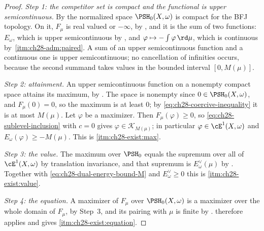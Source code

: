 \begin{proof}
\emph{Step 1: the competitor set is compact and the functional is upper
semicontinuous.}  By  the normalized space
$\PSH_0(X,\omega)$ is compact for the BFJ topology.  On it, $F_\mu$ is
real valued or $-\infty$, by , and it is the sum
of two functions: $E_\omega$, which is upper semicontinuous by
, and
$\varphi\mapsto-\int\varphi\,\rd\mu$, which is continuous by
\,\cref{itm:ch28-adm:paired}.  A sum of an
upper semicontinuous function and a continuous one is upper semicontinuous;
no cancellation of infinities occurs, because the second summand takes
values in the bounded interval $[0,M(\mu)]$.

\emph{Step 2: attainment.}  An upper semicontinuous function on a nonempty
compact space attains its maximum, by .  The space
is nonempty since $0\in\PSH_0(X,\omega)$, and $F_\mu(0)=0$, so the
maximum is at least $0$; by \eqref{eq:ch28-coercive-inequality} it is at
most $M(\mu)$.  Let $\varphi$ be a maximizer.  Then
$F_\mu(\varphi)\geq0$, so \eqref{eq:ch28-sublevel-inclusion} with $c=0$
gives $\varphi\in\mathcal K_{M(\mu)}$; in particular
$\varphi\in\cE^1(X,\omega)$ and $E_\omega(\varphi)\geq-M(\mu)$.  This is
\cref{itm:ch28-exist:max}.

\emph{Step 3: the value.}  The maximum over $\PSH_0$ equals the supremum
over all of $\cE^1(X,\omega)$ by translation invariance, and that supremum
is $E^\vee_\omega(\mu)$ by .  Together
with \eqref{eq:ch28-dual-energy-bound-M} and $E^\vee_\omega\geq0$ this is
\cref{itm:ch28-exist:value}.

\emph{Step 4: the equation.}  A maximizer of $F_\mu$ over
$\PSH_0(X,\omega)$ is a maximizer over the whole domain of $F_\mu$, by
Step~3, and its pairing with $\mu$ is finite by
.  
therefore applies and gives \cref{itm:ch28-exist:equation}.
\end{proof}

